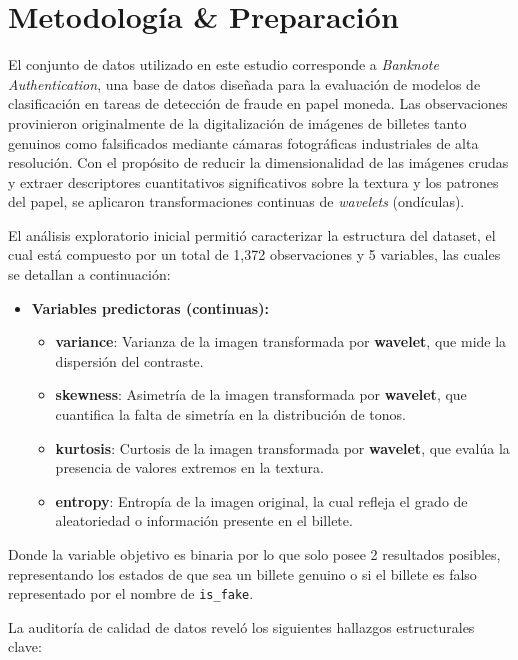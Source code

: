 \documentclass[conference]{IEEEtran}
\begin{document}
	\section{Metodología \& Preparación}
	El conjunto de datos utilizado en este estudio corresponde a \textit{Banknote Authentication}, una base de datos diseñada para la evaluación de modelos de clasificación en tareas de detección de fraude en papel moneda. Las observaciones provinieron originalmente de la digitalización de imágenes de billetes tanto genuinos como falsificados mediante cámaras fotográficas industriales de alta resolución. Con el propósito de reducir la dimensionalidad de las imágenes crudas y extraer descriptores cuantitativos significativos sobre la textura y los patrones del papel, se aplicaron transformaciones continuas de \textit{wavelets} (ondículas).
	
	El análisis exploratorio inicial permitió caracterizar la estructura del dataset, el cual está compuesto por un total de 1,372 observaciones y 5 variables, las cuales se detallan a continuación:
	
	\begin{itemize}
		\item \textbf{Variables predictoras (continuas):}
		\begin{itemize}
			\item \textbf{variance}: Varianza de la imagen transformada por \textbf{wavelet}, que mide la dispersión del contraste.
			\item \textbf{skewness}: Asimetría de la imagen transformada por \textbf{wavelet}, que cuantifica la falta de simetría en la distribución de tonos.
			\item \textbf{kurtosis}: Curtosis de la imagen transformada por \textbf{wavelet}, que evalúa la presencia de valores extremos en la textura.
			\item \textbf{entropy}: Entropía de la imagen original, la cual refleja el grado de aleatoriedad o información presente en el billete.
		\end{itemize}
		
	\end{itemize}
	
	
	Donde la variable objetivo es binaria por lo que solo posee 2 resultados posibles, representando los estados de que sea un billete genuino o si el billete es falso representado por el nombre de \texttt{is\_fake}.
	
	La auditoría de calidad de datos reveló los siguientes hallazgos estructurales clave:
	
\end{document}
